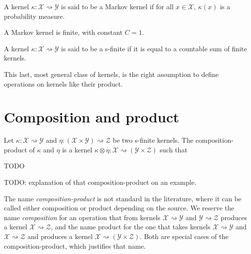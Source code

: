 \begin{definition}
  \label{def:markov_kernel}
  \leanok
  A kernel $\kappa : \mathcal X \rightsquigarrow \mathcal Y$ is said to be a Markov kernel if for all $x \in \mathcal X$, $\kappa(x)$ is a probability measure.
\end{definition}

A Markov kernel is finite, with constant $C = 1$.

\begin{definition}
  \label{def:sFinite_kernel}
  \leanok
  A kernel $\kappa : \mathcal X \rightsquigarrow \mathcal Y$ is said to be a s-finite if it is equal to a countable sum of finite kernels.
\end{definition}

This last, most general class of kernels, is the right assumption to define operations on kernels like their product.

\section{Composition and product}

\begin{definition}
  \label{def:kernel_compProd}
  \leanok
  Let $\kappa : \mathcal X \rightsquigarrow \mathcal Y$ and $\eta : (\mathcal X \times \mathcal Y) \rightsquigarrow \mathcal Z$ be two s-finite kernels.
  The composition-product of $\kappa$ and $\eta$ is a kernel $\kappa \otimes \eta : \mathcal X \rightsquigarrow (\mathcal Y \times \mathcal Z)$ such that

  TODO
\end{definition}

TODO: explanation of that composition-product on an example.

The name \emph{composition-product} is not standard in the literature, where it can be called either composition or product depending on the source.
We reserve the name \emph{composition} for an operation that from kernels $\mathcal X \rightsquigarrow \mathcal Y$ and $\mathcal Y \rightsquigarrow \mathcal Z$ produces a kernel $\mathcal X \rightsquigarrow \mathcal Z$, and the name product for the one that takes kernels $\mathcal X \rightsquigarrow \mathcal Y$ and $\mathcal X \rightsquigarrow \mathcal Z$ and produces a kernel $\mathcal X \rightsquigarrow (\mathcal Y \times \mathcal Z)$.
Both are special cases of the composition-product, which justifies that name.

